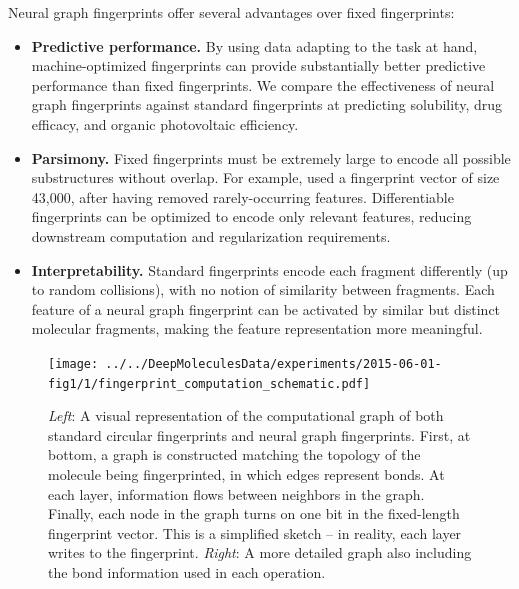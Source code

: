 \documentclass{article}
\begin{document}
Neural graph fingerprints offer several advantages over fixed fingerprints:
\begin{itemize}
\item {\bf Predictive performance.}
By using data adapting to the task at hand, machine-optimized fingerprints can provide substantially better predictive performance than fixed fingerprints.
We compare the effectiveness of neural graph fingerprints against standard fingerprints at predicting %
solubility, drug efficacy, and organic photovoltaic efficiency.
\item {\bf Parsimony.}
Fixed fingerprints must be extremely large to encode all possible substructures without overlap.
For example, \cite{unterthinerdeep} used a fingerprint vector of size 43,000, after having removed rarely-occurring features.
Differentiable fingerprints can be optimized to encode only relevant features, reducing downstream computation and regularization requirements.
\item {\bf Interpretability.}
Standard fingerprints encode each fragment differently (up to random collisions), with no notion of similarity between fragments.
Each feature of a neural graph fingerprint can be activated by similar but distinct molecular fragments, making the feature representation more meaningful.
\end{itemize}

\begin{figure}
\centerline{\texttt{[image: ../../DeepMoleculesData/experiments/2015-06-01-fig1/1/fingerprint\_computation\_schematic.pdf]}
\hspace{5em}
}
\vspace{-1mm}
\caption{\emph{Left}: A visual representation of the computational graph of both standard circular fingerprints and neural graph fingerprints.
First, at bottom, a graph is constructed matching the topology of the molecule being fingerprinted, in which edges represent bonds.
At each layer, information flows between neighbors in the graph.
Finally, each node in the graph turns on one bit in the fixed-length fingerprint vector.
This is a simplified sketch -- in reality, each layer writes to the fingerprint.
\emph{Right}: A more detailed graph also including the bond information used in each operation.}
\label{fig:architecture sketch}
\end{figure}
\end{document}
